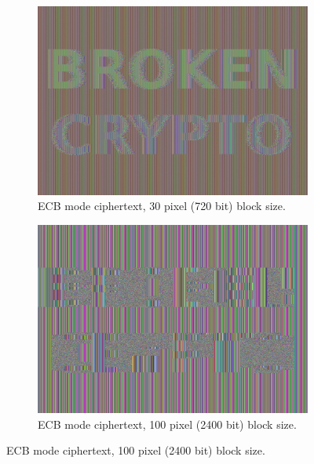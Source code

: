 \documentclass[11pt,ebook,table,dvipsnames]{memoir}
\begin{document}
\begin{figure}[p]
  \begin{subfigure}[b]{.45\textwidth}
    \includegraphics[width=\textwidth]{./Illustrations/ECB/Ciphertext30.png}
    \caption{ECB mode ciphertext, 30 pixel (720 bit) block size.}
  \end{subfigure}
  \quad
  \begin{subfigure}[b]{.45\textwidth}
    \includegraphics[width=\textwidth]{./Illustrations/ECB/Ciphertext100.png}
    \caption{ECB mode ciphertext, 100 pixel (2400 bit) block size.}
  \end{subfigure}


\end{figure}
\end{document}
